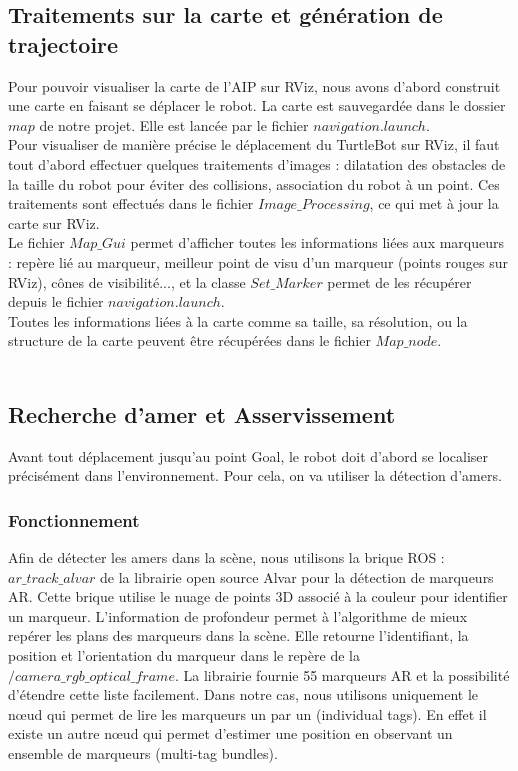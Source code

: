 \documentclass[10pt,a4paper]{article}
\begin{document}
\subsection{Traitements sur la carte et génération de trajectoire}
\label{sec:traitements}

Pour pouvoir visualiser la carte de l'AIP sur RViz, nous avons d'abord construit une carte en faisant se déplacer le robot. La carte est sauvegardée dans le dossier $map$ de notre projet. Elle est lancée par le fichier $navigation.launch$.\\

Pour visualiser de manière précise le déplacement du TurtleBot sur RViz, il faut tout d'abord effectuer quelques traitements d'images : dilatation des obstacles de la taille du robot pour éviter des collisions, association du robot à un point. Ces traitements sont effectués dans le fichier $Image\_Processing$, ce qui met à jour la carte sur RViz.\\

Le fichier $Map\_Gui$ permet d'afficher toutes les informations liées aux marqueurs : repère lié au marqueur, meilleur point de visu d'un marqueur (points rouges sur RViz), cônes de visibilité..., et la classe $Set\_Marker$ permet de les récupérer depuis le fichier $navigation.launch$.\\
Toutes les informations liées à la carte comme sa taille, sa résolution, ou la structure de la carte peuvent être récupérées dans le fichier $Map\_node$.\\\\


\subsection{Recherche d'amer et Asservissement}
\label{sec:recherche}

Avant tout déplacement jusqu'au point Goal, le robot doit d'abord se localiser précisément dans l'environnement. Pour cela, on va utiliser la détection d'amers.

\subsubsection{Fonctionnement}
Afin de détecter les amers dans la scène, nous utilisons la brique ROS : $ar\_track\_alvar$ de la librairie open source Alvar pour la détection de marqueurs AR.
Cette brique utilise le nuage de points 3D associé à la couleur pour identifier un marqueur. L'information de profondeur permet à l'algorithme de mieux repérer les plans des marqueurs dans la scène. Elle retourne l'identifiant, la position et l'orientation du marqueur dans le repère de la $/camera\_rgb\_optical\_frame$. La librairie fournie 55 marqueurs AR et la possibilité d'étendre cette liste facilement. Dans notre cas, nous utilisons uniquement le nœud qui permet de lire les marqueurs un par un (individual tags). En effet il existe un autre nœud qui permet d'estimer une position en observant un ensemble de marqueurs (multi-tag bundles).
\end{document}
